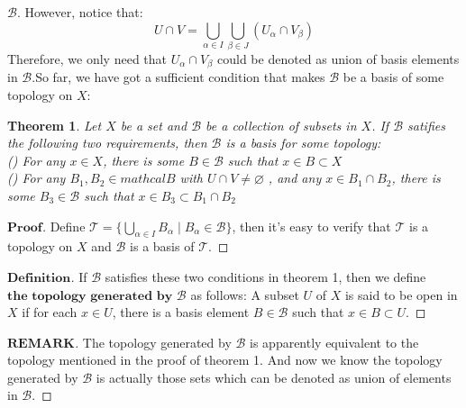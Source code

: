 \documentclass[a4paper, 11pt]{article}
\newtheorem{theorem}{Theorem}
\theoremstyle{remark}
\newenvironment{myremark}
{\renewcommand\qedsymbol{$ $}\begin{proof}[$\mathbf{REMARK}$]}
  {\end{proof}}
\newenvironment{myprf}
{\renewcommand\qedsymbol{$ $}\begin{proof}[$\mathbf{Proof}$]}
  {\end{proof}}
\newenvironment{mydef}
{\renewcommand\qedsymbol{$ $}\begin{proof}[$\mathbf{Definition}$]}
  {\end{proof}}
\theoremstyle{definition}
\begin{document}
$\mathcal{B}$. However, notice that:
$$
U\cap V=\bigcup_{\alpha\in I}\bigcup_{\beta\in J}(U_{\alpha}\cap V_{\beta})
$$ Therefore, we only need that $U_{\alpha}\cap V_{\beta}$ could be denoted as union of basis elements in $\mathcal{B}$.So far, we have got a sufficient condition 
that makes $\mathcal{B}$ be a basis of some topology on $X$:
\begin{theorem}
        Let $X$ be a set and $\mathcal{B}$ be a collection of subsets in $X$. If
        $\mathcal{B}$ satifies the following two requirements, then $\mathcal{B}$
        is a basis for some topology:\\
        () For any $x\in X$, there is some $B\in \mathcal{B}$ 
        such that $x\in B\subset X$\\
        () For any $B_1,B_2\in mathcal{B}$ with $U\cap V\neq \varnothing$
        , and any $x\in B_1\cap B_2$, there is some $B_3\in \mathcal{B}$ such that
        $x\in B_3\subset B_1\cap B_2$
\end{theorem}
\begin{myprf}
       Define $\mathcal{T}=\{\bigcup_{\alpha\in I} B_{\alpha}\mid B_{\alpha}\in
       \mathcal{B}\}$, then it's easy to verify that $\mathcal{T}$ is a topology
       on $X$ and $\mathcal{B}$ is a basis of $\mathcal{T}$.
\end{myprf}
\vspace{0.5cm}
\begin{mydef}
       If $\mathcal{B}$ satisfies these two conditions in theorem 1, then we
       define $\textbf{the topology} $ $\textbf{generated by}$ $\mathcal{B}$ as
       follows: A subset $U$ of $X$ is said to be open in $X$ if for each 
       $x\in U$, there is a basis element $B\in \mathcal{B}$ such that 
       $x\in B\subset U$.
\end{mydef}
\begin{myremark}
        The topology generated by $\mathcal{B}$ is apparently equivalent
        to the topology mentioned in the proof of theorem 1. And now we know
        the topology generated by $\mathcal{B}$ is actually those sets which
        can be denoted as union of elements in $\mathcal{B}$.
\end{myremark}
\end{document}
